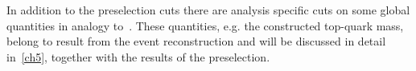  In addition to the preselection cuts there are analysis specific cuts on some global quantities in analogy to~\cite{ATLAS-CONF-2017-071}. These quantities, e.g. the constructed top-quark mass, belong to result  from the event reconstruction and will be discussed in detail in~\cref{ch5}, together with the results of the preselection.





















\clearpage
